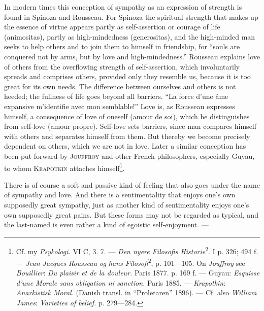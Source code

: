\documentclass[12pt,a4paper,openany]{book}
\newcommand{\opage}[1]{\marginnote{\footnotesize\textit{[#1]}}}
\begin{document}
In modern times this conception of sympathy as an expression of strength is found in Spinoza and Rousseau. For
Spinoza the spiritual strength that makes up the essence of virtue appears partly as self-assertion or courage
of life (animositas), partly as high-mindedness (generositas), and the high-minded man seeks to help others and
to join them to himself in friendship, for ``souls are conquered not by arms, but by love and
high-mindedness.'' Rousseau explains love of others from the overflowing strength of self-assertion,
\opage{187}which involuntarily spreads and comprises others, provided only they resemble us, because it is too great
for its own needs. The difference between ourselves and others is not heeded; the fullness of life goes beyond
all barriers. ``La force d'une âme expansive m'identifie avec mon semblable!'' Love is, as Rousseau expresses
himself, a consequence of love of oneself (amour de soi), which he distinguishes from self-love (amour propre).
Self-love sets barriers, since man compares himself with others and separates himself from them. But thereby we
become precisely dependent on others, which we are not in love. Later a similar conception has been put forward
by \textsc{Jouffroy} and other French philosophers, especially Guyau, to whom \textsc{Krapotkin} attaches
himself\footnote[1]{Cf. my \textit{Psykologi.} VI C, 3. 7. --- \textit{Den nyere Filosofis
Historie}\textsuperscript{2}. I p. 326; 494 f. --- \textit{Jean Jacques Rousseau og hans
Filosofi}\textsuperscript{2}, p. 101---105. On \emph{Jouffroy} see \emph{Bouillier}: \textit{Du plaisir et de la
douleur.} Paris 1877. p. 169 f. --- Guyau: \textit{Esquisse d'une Morale sans obligation ni sanction.} Paris
1885. --- \emph{Krapotkin}: \textit{Anarkistisk Moral.} (Danish transl. in ``Proletaren'' 1896). --- Cf. also
\emph{William James}: \textit{Varieties of belief.} p. 279---284.}.

There is of course a soft and passive kind of feeling that also goes under the name of sympathy and love. And
there is a sentimentality that enjoys one's own supposedly great sympathy, just as another kind of sentimentality
enjoys one's own supposedly great pains. But these forms may not be regarded as typical, and the last-named is
even rather a kind of egoistic self-enjoyment. ---
\end{document}
